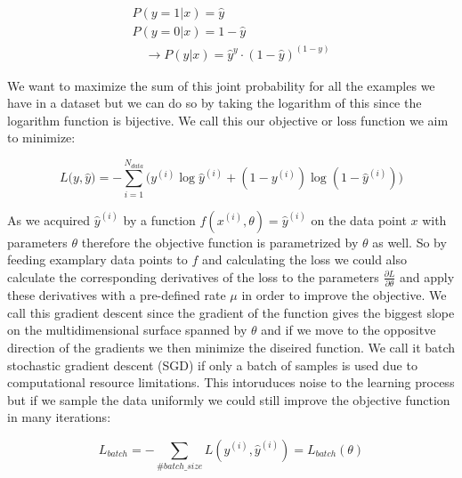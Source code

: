 \documentclass[a4paper,12pt]{article}
\begin{document}
\vspace{4mm}

\begin{align}
    P(y = 1 | x) = \hat{y} \\
    P(y = 0 | x) = 1 - \hat{y} \\
    \quad \rightarrow P(y | x) = \hat{y}^{y} \cdot (1 - \hat{y})^{(1-y)}
\end{align}

\vspace{4mm}

\par We want to maximize the sum of this joint probability for all the examples we have in a dataset but we can do so by taking the logarithm of this since the logarithm function is bijective. We call this our objective or loss function we aim to minimize:

\vspace{4mm}

\begin{equation}
    L\big(y, \hat{y}\big) = -\sum_{i = 1}^{N_{data}} \Big(y^{(i)}\log\hat{y}^{(i)} + (1 - y^{(i)})\log(1 - \hat{y}^{(i)})\Big)
\end{equation}

\vspace{4mm}

\par As we acquired $\hat{y}^{(i)}$ by a function $f(x^{(i)}, \theta) = \hat{y}^{(i)}$ on the data point $x$ with parameters $\theta$ therefore the objective function is parametrized by $\theta$ as well. So by feeding examplary data points to $f$ and calculating the loss we could also calculate the corresponding derivatives of the loss to the parameters $\frac{\partial L}{\partial \theta}$ and apply these derivatives with a pre-defined rate $\mu$ in order to improve the objective. We call this gradient descent since the gradient of the function gives the biggest slope on the multidimensional surface spanned by $\theta$ and if we move to the oppositve direction of the gradients we then minimize the diseired function. We call it batch stochastic gradient descent (SGD) if only a batch of samples is used due to computational resource limitations. This intoruduces noise to the learning process but if we sample the data uniformly we could still improve the objective function in many iterations:

\vspace{4mm}

\begin{equation}
    L_{batch} = - \sum_{\#batch\_size}L(y^{(i)}, \hat{y}^{(i)}) = L_{batch}(\theta)  
\end{equation}
\end{document}

